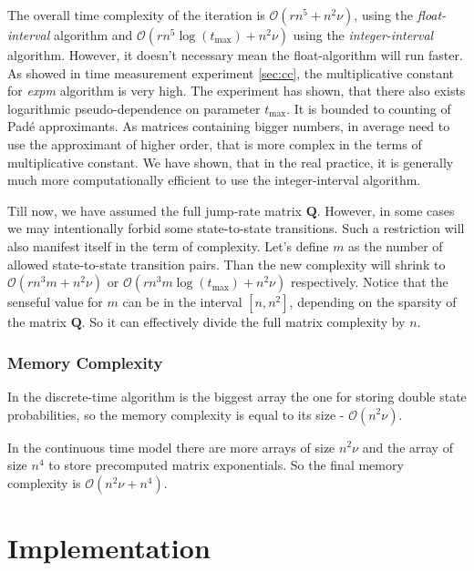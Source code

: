 \documentclass[thesis=M,english]{FITthesis}[2012/10/20]
\newcommand{\matr}[1]{\mathbf{#1}}
\begin{document}
\begin{itemize}
\begin{itemize}
\begin{enumerate}[resume]
\end{enumerate}
 

\end{itemize}   

The overall time complexity of the iteration is $\mathcal{O}( r n^5 + n^2\nu )$, using the \textit{float-interval} algorithm and $\mathcal{O}( r n^5\log(t_{\max}) + n^2\nu )$ using the \textit{integer-interval} algorithm. However, it doesn't necessary mean the float-algorithm will run faster. As showed in time measurement experiment \ref{sec:cc}, the multiplicative constant for \textit{expm} algorithm is very high. The experiment has shown, that there also exists logarithmic pseudo-dependence on parameter $t_{\max}$. It is bounded to counting of Pad\'{e} approximants. As matrices containing bigger numbers, in average need to use the approximant of higher order,  that is more complex in the terms of multiplicative constant. We have shown, that in the real practice, it is generally much more computationally efficient to use the integer-interval algorithm.

Till now, we have assumed the full jump-rate matrix $\matr{Q}$. However, in some cases we may intentionally forbid some state-to-state transitions. Such a restriction will also manifest itself in the term of complexity. Let's define $m$ as the number of allowed state-to-state transition pairs. Than the new complexity will shrink to $\mathcal{O}( r n^3 m + n^2\nu )$ or $\mathcal{O}( r n^3 m \log(t_{\max}) + n^2\nu )$ respectively. Notice that the senseful value for $m$ can be in the interval $[n,n^2]$, depending on the sparsity of the matrix $\matr{Q}$. So it can effectively divide the full matrix complexity by $n$.  

\end{itemize}

\subsection{Memory Complexity}
In the discrete-time algorithm is the biggest array the one for storing double state probabilities, so the memory complexity is equal to its size - $\mathcal{O}(n^2\nu)$. 

In the continuous time model there are more arrays of size $n^2\nu$ and the array of size $n^4$ to store precomputed matrix exponentials. So the final memory complexity is $\mathcal{O}( n^2\nu + n^4 )$.

\chapter{Implementation}
\end{document}
